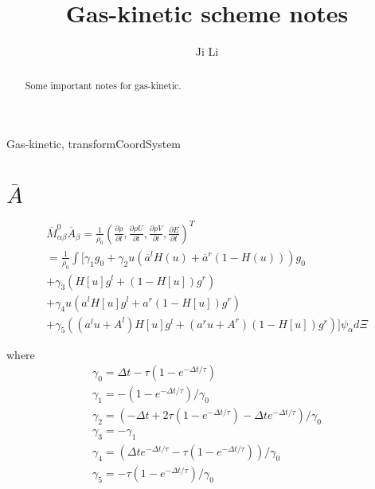 \documentclass[review]{elsarticle}
\begin{document}
\begin{frontmatter}

\title{Gas-kinetic scheme notes}

\author[mysecondaryaddress]{Ji Li}
\address{National Key Laboratory of Science and Technology on Aerodynamic Design and Research, Northwestern Polytechnical University, Xi'an, Shaanxi 710072, China}
\begin{abstract}
	Some important notes for gas-kinetic.
\end{abstract}

\begin{keyword}
	Gas-kinetic, transformCoordSystem
\end{keyword}

\end{frontmatter}

\linenumbers

\section{$\overline{A}$}
\begin{eqnarray}
\overline{M}_{\alpha\beta}^{0}\overline{A}_\beta = \frac{1}{\rho_0}\left(\frac{\partial \rho}{\partial t},
\frac{\partial {{\rho}U}}{\partial t},\frac{\partial {{\rho}V}}{\partial t},\frac{\partial E}{\partial t}\right)^T \nonumber \\
= \frac{1}{\rho_0} \int [{\gamma}_1g_0 + \gamma_2u(\overline{a}^lH(u)+\overline{a}^r(1-H(u)))g_0 \nonumber\\
+\gamma_3\left(H[u]g^l+(1-H[u])g^r\right) \\
+\gamma_4u\left(a^lH[u]g^l + a^r(1-H[u])g^r\right) \nonumber\\
+\gamma_5\left((a^lu+A^l)H[u]g^l + (a^ru + A^r)(1-H[u])g^r   \right)]  
\psi_{\alpha}d\Xi  \nonumber
\end{eqnarray}

where
\begin{eqnarray}
	\gamma_0 = \Delta{t} - \tau\left(1-e^{-\Delta{t}/\tau} \right) \\
	\gamma_1 = -\left(1-e^{-\Delta{t}/\tau} \right)/\gamma_0 \\
	\gamma_2 = \left(-\Delta{t} + 2\tau\left(1 - e^{-\Delta{t}/\tau}   \right) - \Delta{t}e^{-\Delta{t}/\tau}  \right)/\gamma_0 \\
	\gamma_3 = - \gamma_1 \\
	\gamma_4 = \left( 
	\Delta{t}e^{-\Delta{t}/\tau} - \tau\left(
	1 - e^{-\Delta{t}/\tau}
	\right) 
	\right) / \gamma_0 \\
	\gamma_5 = -\tau\left(
	1 - e^{-\Delta{t}/\tau}
	\right)/\gamma_0
\end{eqnarray}
\end{document}
